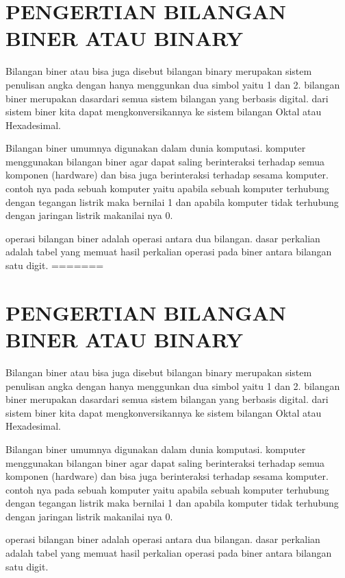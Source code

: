 \section{PENGERTIAN BILANGAN BINER ATAU BINARY}

Bilangan biner atau bisa juga disebut bilangan binary merupakan sistem penulisan angka dengan hanya menggunkan dua simbol 
yaitu 1 dan 2. bilangan biner merupakan dasardari semua sistem bilangan yang berbasis digital. dari sistem biner kita dapat 
mengkonversikannya ke sistem bilangan Oktal atau Hexadesimal.

Bilangan biner umumnya digunakan dalam dunia komputasi. komputer menggunakan bilangan biner agar dapat saling berinteraksi 
terhadap semua komponen (hardware) dan bisa juga berinteraksi terhadap sesama komputer. contoh nya pada sebuah komputer yaitu 
apabila sebuah komputer terhubung dengan tegangan listrik maka bernilai 1 dan apabila komputer tidak terhubung dengan jaringan 
listrik makanilai nya 0.

operasi bilangan biner  adalah operasi antara dua bilangan. dasar perkalian adalah tabel yang memuat hasil perkalian operasi 
pada biner antara bilangan satu digit.
=======
\section{PENGERTIAN BILANGAN BINER ATAU BINARY}

Bilangan biner atau bisa juga disebut bilangan binary merupakan sistem penulisan angka dengan hanya menggunkan dua simbol 
yaitu 1 dan 2. bilangan biner merupakan dasardari semua sistem bilangan yang berbasis digital. dari sistem biner kita dapat 
mengkonversikannya ke sistem bilangan Oktal atau Hexadesimal.

Bilangan biner umumnya digunakan dalam dunia komputasi. komputer menggunakan bilangan biner agar dapat saling berinteraksi 
terhadap semua komponen (hardware) dan bisa juga berinteraksi terhadap sesama komputer. contoh nya pada sebuah komputer yaitu 
apabila sebuah komputer terhubung dengan tegangan listrik maka bernilai 1 dan apabila komputer tidak terhubung dengan jaringan 
listrik makanilai nya 0.

operasi bilangan biner  adalah operasi antara dua bilangan. dasar perkalian adalah tabel yang memuat hasil perkalian operasi 
pada biner antara bilangan satu digit.

